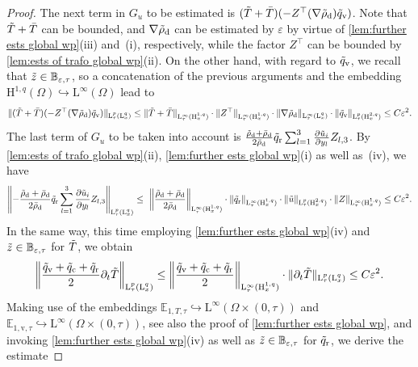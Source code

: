 \documentclass[10pt]{amsart}
\theoremstyle{plain}
\theoremstyle{definition}
\theoremstyle{thm}
\numberwithin{equation}{section}
\newcommand{\rL}{\mathrm{L}}
\newcommand{\rH}{\mathrm{H}}
\newcommand{\E}{\mathbb{E}}
\newcommand{\del}{\partial}
\newcommand{\eps}{\varepsilon}
\newcommand{\rd}{\mathrm{d}}
\newcommand{\rr}{\mathrm{r}}
\newcommand{\rv}{\mathrm{v}}
\newcommand{\rc}{\mathrm{c}}
\newcommand{\trho}{\Tilde{\rho}}
\newcommand{\tu}{\Tilde{u}}
\newcommand{\tz}{\Tilde{z}}
\newcommand{\tT}{\Tilde{T}}
\newcommand{\tq}{\Tilde{q}}
\begin{document}
\begin{proof}
The next term in $G_u$ to be estimated is $(\tT + \bar{T} )(-Z^\top (\nabla \trho_\rd) \tq_\rv )$. 
Note that $\tT+\bar{T}$ can be bounded, and $\nabla \trho_{\rd}$ can be estimated by $\eps$ by virtue of \autoref{lem:further ests global wp}(iii) and~(i), respectively, while the factor $Z^\top$ can be bounded by \autoref{lem:ests of trafo global wp}(ii).
On the other hand, with regard to $\tq_\rv$, we recall that $\tz \in \mathbb{B_{\eps,\tau}}$, so a concatenation of the previous arguments and the embedding $\rH^{1,q}(\Omega) \hookrightarrow \rL^\infty(\Omega)$ lead to
\begin{equation*}
    \begin{aligned}
        \|(\tT + \bar{T} )(-Z^\top (\nabla \trho_\rd) \tq_\rv )\|_{\rL_\tau^{p}(\rL^{q}_x)}
        \leq \|\tT + \bar{T}\|_{\rL_\tau^{\infty}(\rH^{1,q}_x)} \cdot \|Z^\top\|_{\rL_\tau^{\infty}(\rH^{1,q}_x)} \cdot \|\nabla \trho_\rd\|_{\rL_\tau^{\infty}(\rL^{q}_x)} \cdot \|\tq_\rv\|_{\rL_\tau^{p}(\rH^{2,q}_x)}\le C\eps^2.
    \end{aligned}
\end{equation*}
The last term of $G_u$ to be taken into account is $\frac{\trho_\rd + \bar{\rho}_\rd}{2\bar{\rho}_\rd}\tq_\rr \sum_{l=1}^3\frac{\del \tu_i}{\del y_l}Z_{l,3}$.  
By \autoref{lem:ests of trafo global wp}(ii), \autoref{lem:further ests global wp}(i) as well as~(iv), we have 
\begin{equation*}
    \begin{aligned}
        \left\| - \frac{\trho_\rd + \bar{\rho}_\rd}{2\bar{\rho}_\rd}\tq_\rr \sum_{l=1}^3\frac{\del \tu_i}{\del y_l}Z_{l,3}\right\|_{\rL_\tau^{p}(\rL^{q}_x)}
        \leq ~\left\|\frac{\trho_\rd + \bar{\rho}_\rd}{2\bar{\rho}_\rd}\right\|_{\rL_\tau^{\infty}(\rH^{1,q}_x)} \cdot \|\tq_\rr\|_{\rL_\tau^{\infty}(\rH^{1,q}_x)} \cdot \|\tu\|_{\rL_\tau^{p}(\rH^{2,q}_x)} \cdot \|Z\|_{\rL_\tau^{\infty}(\rH^{1,q}_x)}\leq C\eps^2.
    \end{aligned}
\end{equation*}
In the same way, this time employing \autoref{lem:further ests global wp}(iv) and $\tz  \in \mathbb{B_{\eps,\tau}}$ for $\tT$, we obtain
 \begin{equation*}
    \left\| \frac{\tq_\rv + \tq_\rc + \tq_\rr}{2}\del_t\tT\right\|_{\rL_\tau^{p}(\rL^{q}_x)}\leq\left\|\frac{\tq_\rv + \tq_\rc + \tq_\rr}{2}\right\|_{\rL_\tau^{\infty}(\rH^{1,q}_x)} \cdot \|\del_t\tT\|_{\rL_\tau^{p}(\rL^{q}_x)}\leq C\eps^2.
 \end{equation*}
Making use of the embeddings $\E_{1,T,\tau}\hookrightarrow \rL^\infty(\Omega \times (0,\tau))$ and $\E_{1,\rv,\tau} \hookrightarrow \rL^\infty(\Omega \times (0,\tau))$, see also the proof of \autoref{lem:further ests global wp}, and invoking \autoref{lem:further ests global wp}(iv) as well as $\tz  \in \mathbb{B_{\eps,\tau}}$ for $\tq_\rr$, we derive the estimate

\end{proof}
\end{document}
